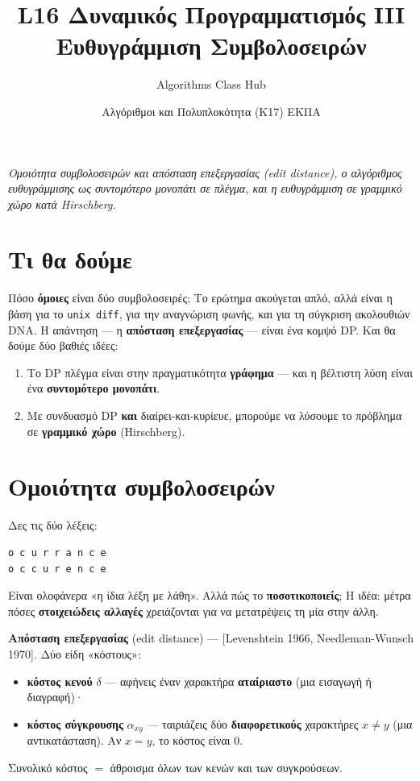 \documentclass[11pt,a4paper]{article}
\title{\textbf{L16 \textperiodcentered{} Δυναμικός Προγραμματισμός III}\\[2pt]
\large Ευθυγράμμιση Συμβολοσειρών}
\author{Algorithms Class Hub}
\date{\small Αλγόριθμοι και Πολυπλοκότητα (K17) \textperiodcentered{} ΕΚΠΑ}
\begin{document}
\maketitle

\begin{center}\itshape\small
Ομοιότητα συμβολοσειρών και απόσταση επεξεργασίας (edit distance), ο αλγόριθμος
ευθυγράμμισης ως συντομότερο μονοπάτι σε πλέγμα, και η ευθυγράμμιση σε γραμμικό
χώρο κατά Hirschberg.
\end{center}

\section{Τι θα δούμε}

Πόσο \textbf{όμοιες} είναι δύο συμβολοσειρές; Το ερώτημα ακούγεται απλό, αλλά
είναι η βάση για το \texttt{unix diff}, για την αναγνώριση φωνής, και για τη
σύγκριση ακολουθιών DNA. Η απάντηση --- η \textbf{απόσταση επεξεργασίας} ---
είναι ένα κομψό DP. Και θα δούμε δύο βαθιές ιδέες:
\begin{enumerate}
  \item Το DP πλέγμα είναι στην πραγματικότητα \textbf{γράφημα} --- και η
  βέλτιστη λύση είναι ένα \textbf{συντομότερο μονοπάτι}.
  \item Με συνδυασμό DP \textbf{και} διαίρει-και-κυρίευε, μπορούμε να λύσουμε το
  πρόβλημα σε \textbf{γραμμικό χώρο} (Hirschberg).
\end{enumerate}

\section{Ομοιότητα συμβολοσειρών}

Δες τις δύο λέξεις:

\begin{codebox}
\begin{verbatim}
o c u r r a n c e
o c c u r e n c e
\end{verbatim}
\end{codebox}

Είναι ολοφάνερα «η ίδια λέξη με λάθη». Αλλά πώς το \textbf{ποσοτικοποιείς}; Η
ιδέα: μέτρα πόσες \textbf{στοιχειώδεις αλλαγές} χρειάζονται για να μετατρέψεις τη
μία στην άλλη.

\begin{keypoint}
\textbf{Απόσταση επεξεργασίας} (edit distance) --- [Levenshtein 1966,
Needleman-Wunsch 1970]. Δύο είδη «κόστους»:
\begin{itemize}
  \item \textbf{κόστος κενού} $\delta$ --- αφήνεις έναν χαρακτήρα
  \textbf{αταίριαστο} (μια εισαγωγή ή διαγραφή)·
  \item \textbf{κόστος σύγκρουσης} $\alpha_{xy}$ --- ταιριάζεις δύο
  \textbf{διαφορετικούς} χαρακτήρες $x \ne y$ (μια αντικατάσταση). Αν $x = y$,
  το κόστος είναι $0$.
\end{itemize}
Συνολικό κόστος $=$ άθροισμα όλων των κενών και των συγκρούσεων.
\end{keypoint}
\end{document}
